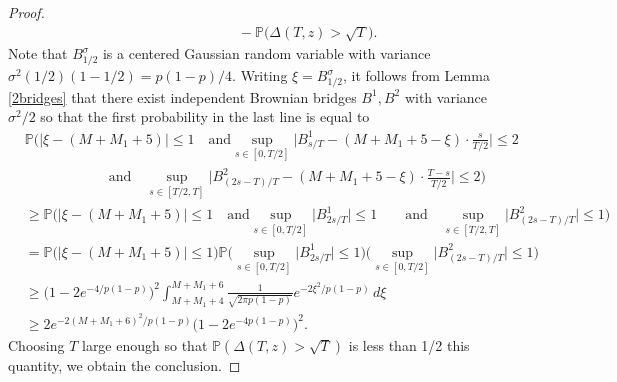 \begin{proof}
\begin{align*}
	&\qquad\qquad\qquad -  \mathbb{P}\Big(\Delta(T,z) > \sqrt{T}\Big).
	\end{align*}
	Note that $B^\sigma_{1/2}$ is a centered Gaussian random variable with variance $\sigma^2(1/2)(1-1/2)=p(1-p)/4$. Writing $\xi = B^\sigma_{1/2}$, it follows from Lemma \ref{2bridges} that there exist independent Brownian bridges $B^1,B^2$ with variance $\sigma^2/2$ so that the first probability in the last line is equal to
	\begin{align*}
	&\mathbb{P}\Big(|\xi - (M+M_1+5)|\leq 1 \quad\mathrm{and} \sup_{s\in[0,T/2]}\Big|B^1_{s/T}-(M+M_1+5-\xi)\cdot\frac{s}{T/2}\Big| \leq 2\\
	&\qquad\qquad\qquad \mathrm{and}\quad \sup_{s\in[T/2,T]}\Big|B^2_{(2s-T)/T}-(M+M_1+5-\xi)\cdot\frac{T-s}{T/2}\Big| \leq 2 \Big)\\
	&\geq \mathbb{P}\Big(|\xi - (M+M_1+5)|\leq 1 \quad\mathrm{and} \sup_{s\in[0,T/2]}\big|B^1_{2s/T}\big| \leq 1 \qquad \mathrm{and}\quad \sup_{s\in[T/2,T]}\big|B^2_{(2s-T)/T}\big| \leq 1 \Big)\\
	&= \mathbb{P}\Big(|\xi-(M+M_1+5)|\leq 1\Big)\mathbb{P}\Big(\sup_{s\in[0,T/2]} \big|B^1_{2s/T}\big|\leq 1\Big)\Big(\sup_{s\in[0,T/2]} \big|B^2_{(2s-T)/T}\big|\leq 1\Big)\\
	&\geq \big(1-2e^{-4/p(1-p)}\big)^2 \int_{M+M_1+4}^{M+M_1+6} \frac{1}{\sqrt{2\pi p(1-p)}}e^{-2\xi^2/p(1-p)}\,d\xi\\
	&\geq 2e^{-2(M+M_1+6)^2/p(1-p)}\big(1-2e^{-4p(1-p)}\big)^2.
	\end{align*}
	Choosing $T$ large enough so that $\mathbb{P}(\Delta(T,z)>\sqrt{T})$ is less than 1/2 this quantity, we obtain the conclusion.
	
\end{proof}
